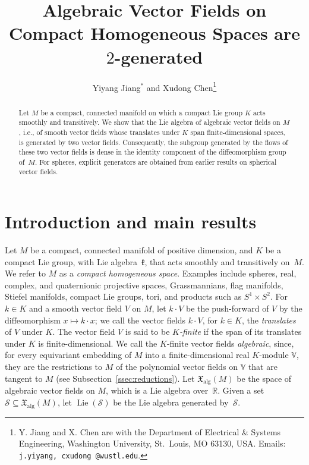 \documentclass{article}
\title{Algebraic Vector Fields on Compact Homogeneous Spaces are $2$-generated}
\author{Yiyang Jiang$^*$ \quad and \quad Xudong Chen\footnote{Y. Jiang and X. Chen are with the Department of Electrical \& Systems Engineering, Washington University, St.~Louis, MO 63130, USA. Emails: {\tt\small \char123 j.yiyang, cxudong\char125 @wustl.edu}.
}}
\date{}
\newcommand{\R}{\mathbb{R}}
\newcommand{\frakk}{\mathfrak{k}}
\newcommand{\xalg}{\mathfrak X_{\mathrm{alg}}}
\theoremstyle{definition}
\theoremstyle{plain}
\begin{document}
\maketitle

{\renewcommand{\thefootnote}{}}




\begin{abstract}
Let $M$ be a compact, connected manifold on which a compact Lie group $K$ acts smoothly and transitively.
We show that the Lie algebra of algebraic vector fields on $M$, i.e., of smooth vector fields whose translates under $K$ span finite-dimensional spaces, is generated by two vector fields.
Consequently, the subgroup generated by the flows of these two vector fields is dense in the identity component of the diffeomorphism group of~$M$.
For spheres, explicit generators are obtained from earlier results on spherical vector fields.
\end{abstract}




\section{Introduction and main results}\label{sec:introduction}

Let $M$ be a compact, connected manifold of positive dimension, and $K$ be a compact Lie group, with Lie algebra~$\frakk$, that acts smoothly and transitively on~$M$.
We refer to $M$ as a {\it compact homogeneous space}.
Examples include spheres, real, complex, and quaternionic projective spaces, Grassmannians, flag manifolds, Stiefel manifolds, compact Lie groups, tori, and products such as $S^1\times S^2$.
 For $k\in K$ and a smooth vector field $V$ on $M$, let $k\cdot V$ be the push-forward of $V$ by the diffeomorphism $x\mapsto k\cdot x$; we call the vector fields $k\cdot V$, for $k\in K$, the {\it translates} of $V$ under $K$.
The vector field $V$ is said to be {\it $K$-finite} if the span of its translates under $K$ is finite-dimensional.
We call the $K$-finite vector fields {\it algebraic}, since, for every equivariant embedding of $M$ into a finite-dimensional real $K$-module $\mathbb V$, they are the restrictions to $M$ of the polynomial vector fields on $\mathbb V$ that are tangent to $M$ (see Subsection~\ref{ssec:reductions}).
Let $\xalg(M)$ be the space of algebraic vector fields on $M$, which is a Lie algebra over~$\R$.
Given a set $\mathcal S \subseteq \xalg(M)$, let $\operatorname{Lie}(\mathcal S)$ be the Lie algebra generated by~$\mathcal S$.
\end{document}
